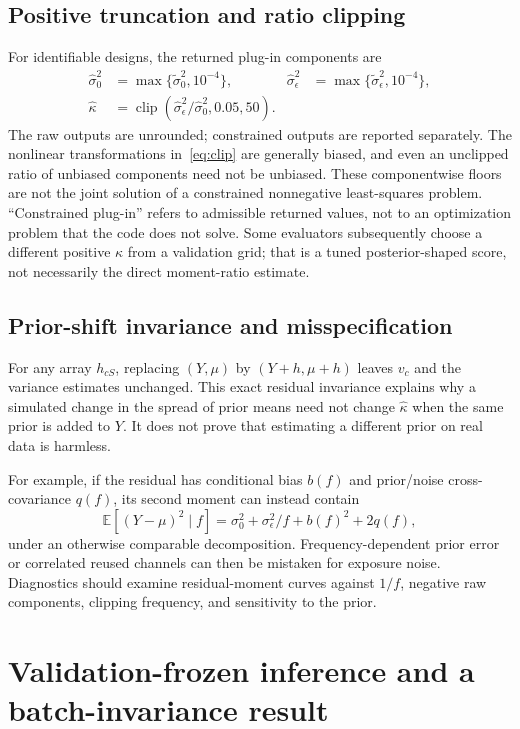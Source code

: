 \documentclass[11pt,a4paper]{article}
\theoremstyle{remark}
\newcommand{\E}{\mathbb{E}}
\begin{document}
\subsection{Positive truncation and ratio clipping}
For identifiable designs, the returned plug-in components are
\begin{align}
 \widehat\sigma_0^2&=\max\{\widetilde\sigma_0^2,10^{-4}\},&
 \widehat\sigma_\epsilon^2&=\max\{\widetilde\sigma_\epsilon^2,10^{-4}\},\\
 \widehat\kappa&=\operatorname{clip}
   (\widehat\sigma_\epsilon^2/\widehat\sigma_0^2,0.05,50).
 \label{eq:clip}
\end{align}
The raw outputs are unrounded; constrained outputs are reported separately.
The nonlinear transformations in~\eqref{eq:clip} are generally biased,
and even an unclipped ratio of unbiased components need not be unbiased.
These componentwise floors are not the joint solution of a constrained
nonnegative least-squares problem. ``Constrained plug-in'' refers to
admissible returned values, not to an optimization problem that the code
does not solve. Some evaluators subsequently choose a different positive
$\kappa$ from a validation grid; that is a tuned posterior-shaped score,
not necessarily the direct moment-ratio estimate.

\subsection{Prior-shift invariance and misspecification}
For any array $h_{cS}$, replacing $(Y,\mu)$ by $(Y+h,\mu+h)$ leaves
$v_c$ and the variance estimates unchanged. This exact residual invariance
explains why a simulated change in the spread of prior means need not
change $\widehat\kappa$ when the same prior is added to $Y$. It does not
prove that estimating a different prior on real data is harmless.

For example, if the residual has conditional bias $b(f)$ and prior/noise
cross-covariance $q(f)$, its second moment can instead contain
\begin{equation}
 \E[(Y-\mu)^2\mid f]
 =\sigma_0^2+\sigma_\epsilon^2/f+b(f)^2+2q(f),
\end{equation}
under an otherwise comparable decomposition. Frequency-dependent prior
error or correlated reused channels can then be mistaken for exposure
noise. Diagnostics should examine residual-moment curves against $1/f$,
negative raw components, clipping frequency, and sensitivity to the prior.

\section{Validation-frozen inference and a batch-invariance result}
\end{document}
